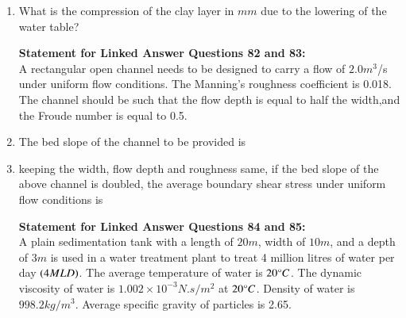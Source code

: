 \documentclass[journal]{IEEEtran}
\begin{document}
\begin{enumerate}[start=74]
\begin{enumerate}
\end{enumerate}
\item %
What is the compression of the clay layer in $mm$ due to the lowering of the water table?
\begin{enumerate}
\end{enumerate}
\textbf{Statement for Linked Answer Questions 82 and 83:}\\
A rectangular open channel needs to be designed to carry a flow of $2.0 m^3$/s under uniform flow conditions. The Manning's roughness coefficient is 0.018. The channel should be such that the flow depth is equal to half the width,and the Froude number is equal to 0.5.
\item %
The bed slope of the channel to be provided is
\begin{enumerate}
\end{enumerate}
\item %
keeping the width, flow depth and roughness same, if the bed slope of the above channel is doubled, the average boundary shear stress under uniform flow conditions is 
\begin{enumerate}
\end{enumerate}
\textbf{Statement for Linked Answer Questions 84 and 85:}\\
A plain sedimentation tank with a length of $20 m$, width of $10 m$, and a depth of $3 m$ is used in a water treatment plant to treat 4 million litres of water per day $\left(4 MLD\right)$. The average temperature of water is $20 \degree C$. The dynamic viscosity of water is $1.002 \times 10^{-3} N.s /m^2$ at $20 \degree C$. Density of water is $998.2 kg/m^3$. Average specific gravity of particles is 2.65.

\end{enumerate}
\end{document}

